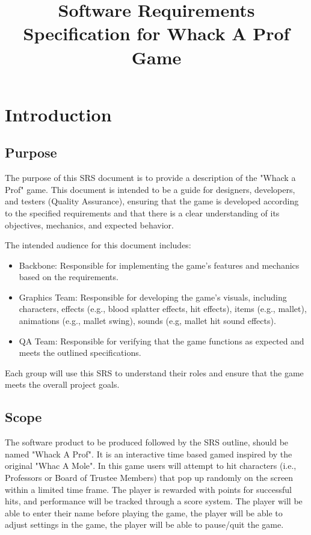 \documentclass{article}
\begin{document}
\title{Software Requirements Specification for Whack A Prof Game}
\author{}
\date{}
\maketitle

\tableofcontents
\newpage

\section{Introduction}
\subsection{Purpose}
The purpose of this SRS document is to provide a description of the "Whack a Prof" game. This document is intended to be a guide for designers, developers, and testers (Quality Assurance), ensuring that the game is developed according to the specified requirements and that there is a clear understanding of its objectives, mechanics, and expected behavior.

The intended audience for this document includes:
\begin{itemize}
    \item Backbone: Responsible for implementing the game’s features and mechanics based on the requirements.
    \item Graphics Team: Responsible for developing the game’s visuals, including characters, effects (e.g., blood splatter effects, hit effects), items (e.g., mallet), animations (e.g., mallet swing), sounds (e.g, mallet hit sound effects).
    \item QA Team: Responsible for verifying that the game functions as expected and meets the outlined specifications.
\end{itemize}
Each group will use this SRS to understand their roles and ensure that the game meets the overall project goals.

\subsection{Scope}
The software product to be produced followed by the SRS outline, should be named "Whack A Prof". It is an interactive time based gamed inspired by the original "Whac A Mole". In this game users will attempt to hit characters (i.e., Professors or Board of Trustee Members) that pop up randomly on the screen within a limited time frame. The player is rewarded with points for successful hits, and performance will be tracked through a score system. The player will be able to enter their name before playing the game, the player will be able to adjust settings in the game, the player will be able to pause/quit the game.
\end{document}

